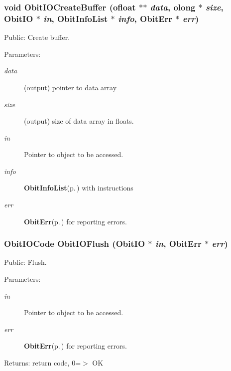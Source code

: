 \subsubsection{\setlength{\rightskip}{0pt plus 5cm}void Obit\-IOCreate\-Buffer ({\bf ofloat} $\ast$$\ast$ {\em data}, {\bf olong} $\ast$ {\em size}, {\bf Obit\-IO} $\ast$ {\em in}, {\bf Obit\-Info\-List} $\ast$ {\em info}, {\bf Obit\-Err} $\ast$ {\em err})}\label{ObitIO_8h_a51}


Public: Create buffer. 

\begin{Desc}
\item[Parameters:]
\begin{description}
\item[{\em data}](output) pointer to data array \item[{\em size}](output) size of data array in floats. \item[{\em in}]Pointer to object to be accessed. \item[{\em info}]{\bf Obit\-Info\-List}{\rm (p.\,\pageref{structObitInfoList})} with instructions \item[{\em err}]{\bf Obit\-Err}{\rm (p.\,\pageref{structObitErr})} for reporting errors. \end{description}
\end{Desc}
\subsubsection{\setlength{\rightskip}{0pt plus 5cm}Obit\-IOCode Obit\-IOFlush ({\bf Obit\-IO} $\ast$ {\em in}, {\bf Obit\-Err} $\ast$ {\em err})}\label{ObitIO_8h_a48}


Public: Flush. 

\begin{Desc}
\item[Parameters:]
\begin{description}
\item[{\em in}]Pointer to object to be accessed. \item[{\em err}]{\bf Obit\-Err}{\rm (p.\,\pageref{structObitErr})} for reporting errors. \end{description}
\end{Desc}
\begin{Desc}
\item[Returns:]return code, 0=$>$ OK \end{Desc}
